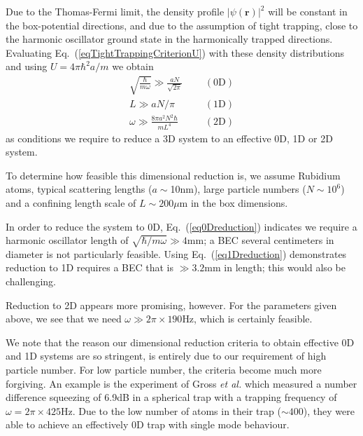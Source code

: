 \documentclass{iopart}
\begin{document}
Due to the Thomas-Fermi limit, the density profile $|\psi({\mathbf{r}})|^2$ will be constant in the box-potential directions, and due to the assumption of tight trapping, close to the harmonic oscillator ground state in the harmonically trapped directions. Evaluating Eq.~(\ref{eqTightTrappingCriterionU}) with these density distributions and using $U=4\pi \hbar^2 a /m$ we obtain
\begin{eqnarray}
\sqrt{\frac{\hbar}{m \omega}}  \gg \frac{aN}{\sqrt{2 \pi}} && \,\,\,\, ({\textrm{0D}}) \label{eq0Dreduction} \\
L  \gg  a N / \pi && \,\,\,\, ({\textrm{1D}}) \label{eq1Dreduction} \\
\omega  \gg  \frac{8 \pi a^2 N^2 \hbar}{m L^4}  && \,\,\,\, ({\textrm{2D}}) \label{eq2Dreduction}
\end{eqnarray}
as conditions we require to reduce a 3D system to an effective 0D, 1D or 2D system.

To determine how feasible this dimensional reduction is, we assume Rubidium atoms, typical scattering lengths ($a\sim$10nm), large particle numbers ($N\sim 10^6$) and a confining length scale of $L\sim 200\mu$m in the box dimensions.

In order to reduce the system to 0D, Eq.~(\ref{eq0Dreduction}) indicates we require a harmonic oscillator length of $\sqrt{\hbar/ m \omega}\gg 4$mm; a BEC several centimeters in diameter is not particularly feasible. Using Eq.~(\ref{eq1Dreduction}) demonstrates reduction to 1D requires a BEC that is $\gg3.2$mm in length; this would also be challenging.

Reduction to 2D appears more promising, however. For the parameters given above, we see that we need $\omega \gg 2\pi\times 190$Hz, which is certainly feasible.

We note that the reason our dimensional reduction criteria to obtain effective 0D and 1D systems are so stringent, is entirely due to our requirement of high particle number. For low particle number, the criteria become much more forgiving. An example is the experiment of Gross {\it et al.} which measured a number difference squeezing of 6.9dB in a spherical trap with a trapping frequency of $\omega=2 \pi \times 425$Hz. Due to the low number of atoms in their trap ($\sim 400$), they were able to achieve an effectively 0D trap with single mode behaviour.
\end{document}
